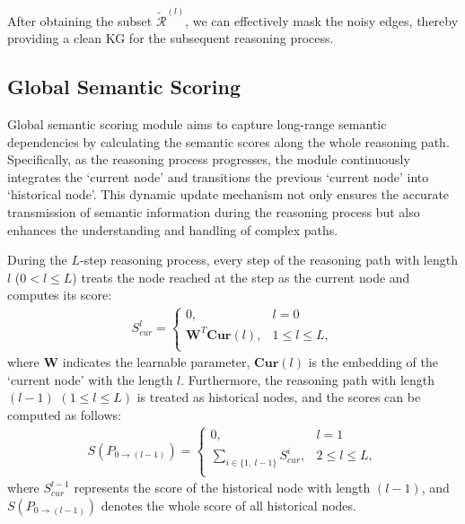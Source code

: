 \documentclass[sigconf]{acmart}
\begin{document}
After obtaining the subset $\widetilde{\mathcal{R}}^{(l)}$, we can effectively mask the noisy edges, thereby providing a clean KG for the subsequent reasoning process.

\subsection{Global Semantic Scoring}
 
Global semantic scoring module aims to capture long-range semantic dependencies by calculating the semantic scores along the whole reasoning path. Specifically, as the reasoning process progresses, the module continuously integrates the `current node' and transitions the previous `current node' into `historical node'. This dynamic update mechanism not only ensures the accurate transmission of semantic information during the reasoning process but also enhances the understanding and handling of complex paths.

During the \(L\)-step reasoning process, every step of the reasoning path with length \(l\) ($0<l\leq L$) treats the node reached at the step as the current node and computes its score:
\vspace{-3pt}
\begin{equation}
\begin{split}
    S_{cur}^l=\left\{
                \begin{array}{ll}
                   0, &l=0\\
                  \mathbf{W}^{T}\mathbf{Cur}(l), &1 \leq l \leq L ,\\
                \end{array}
              \right.\nonumber
\end{split}
\end{equation}
where $\mathbf{W}$ indicates the learnable parameter, $\mathbf{Cur}(l)$ is the embedding of the `current node' with the length $l$. Furthermore, the reasoning path with length $(l-1)$ $(1\leq l\leq L)$ is treated as historical nodes, and the scores can be computed as follows:
\begin{equation}
\begin{split}
    S(P_{0 \rightarrow(l-1)})=\left\{
                \begin{array}{ll}
                   0, &l=1\\
                  \sum_{i\in\{1,\ l-1\}} S_{cur}^{i}, &2 \leq l \leq L ,\\
                \end{array}
              \right.\nonumber
\end{split}
\end{equation}
where $ S_{cur}^{l-1}$ represents the score of the historical node with length $(l-1)$, and $S(P_{0 \rightarrow(l-1)})$ denotes the whole score of all historical nodes.
\end{document}
